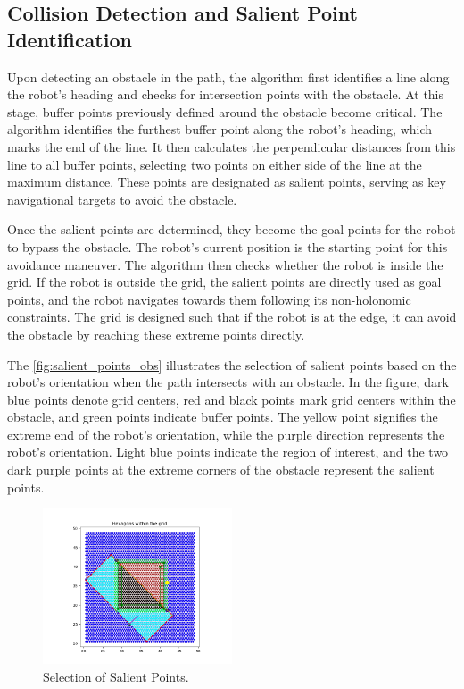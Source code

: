 \subsection{Collision Detection and Salient Point Identification}


Upon detecting an obstacle in the path, the algorithm first identifies a line along the robot’s heading and checks for intersection points with the obstacle. At this stage, buffer points previously defined around the obstacle become critical. The algorithm identifies the furthest buffer point along the robot's heading, which marks the end of the line. It then calculates the perpendicular distances from this line to all buffer points, selecting two points on either side of the line at the maximum distance. These points are designated as salient points, serving as key navigational targets to avoid the obstacle.

\vspace{3mm}  

Once the salient points are determined, they become the goal points for the robot to bypass the obstacle. The robot's current position is the starting point for this avoidance maneuver. The algorithm then checks whether the robot is inside the grid. If the robot is outside the grid, the salient points are directly used as goal points, and the robot navigates towards them following its non-holonomic constraints. The grid is designed such that if the robot is at the edge, it can avoid the obstacle by reaching these extreme points directly.

\vspace{3mm}  

The \autoref{fig:salient_points_obs} illustrates the selection of salient points based on the robot's orientation when the path intersects with an obstacle. In the figure, dark blue points denote grid centers, red and black points mark grid centers within the obstacle, and green points indicate buffer points. The yellow point signifies the extreme end of the robot's orientation, while the purple direction represents the robot's orientation. Light blue points indicate the region of interest, and the two dark purple points at the extreme corners of the obstacle represent the salient points.

\begin{figure}[H]
    \centering
    \includegraphics[width=0.5\textwidth]{Images/Algorithm_obs/Grid/salinet_point3.png}
    \caption{Selection of Salient Points.}
    \label{fig:salient_points_obs} 
\end{figure} 

